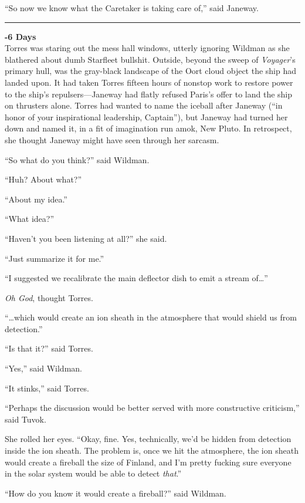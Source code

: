 \documentclass[twoside,letterpaper,12pt]{memoir}
\begin{document}
``So now we know what the Caretaker is taking care of,'' said Janeway. 

\fancybreak{\rule{3cm}{0.4 pt}} 

\noindent\textbf{-6 Days}\\

Torres was staring out the mess hall windows, utterly ignoring Wildman as she blathered about dumb Starfleet bullshit. Outside, beyond the sweep of \textit{Voyager}'s primary hull, was the gray-black landscape of the Oort cloud object the ship had landed upon. It had taken Torres fifteen hours of nonstop work to restore power to the ship's repulsers---Janeway had flatly refused Paris's offer to land the ship on thrusters alone. Torres had wanted to name the iceball after Janeway (``in honor of your inspirational leadership, Captain''), but Janeway had turned her down and named it, in a fit of imagination run amok, New Pluto. In retrospect, she thought Janeway might have seen through her sarcasm. 

``So what do you think?'' said Wildman. 

``Huh? About what?'' 

``About my idea.'' 

``What idea?'' 

``Haven't you been listening at all?'' she said. 

``Just summarize it for me.'' 

``I suggested we recalibrate the main deflector dish to emit a stream of\ldots '' 

\textit{Oh God}, thought Torres. 

``\ldots which would create an ion sheath in the atmosphere that would shield us from detection.'' 

``Is that it?'' said Torres. 

``Yes,'' said Wildman. 

``It stinks,'' said Torres. 

``Perhaps the discussion would be better served with more constructive criticism,'' said Tuvok. 

She rolled her eyes. ``Okay, fine. Yes, technically, we'd be hidden from detection inside the ion sheath. The problem is, once we hit the atmosphere, the ion sheath would create a fireball the size of Finland, and I'm pretty fucking sure everyone in the solar system would be able to detect \textit{that}.'' 

``How do you know it would create a fireball?'' said Wildman. 
\end{document}
